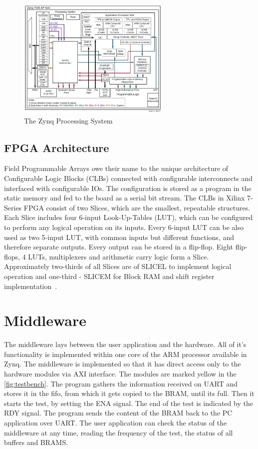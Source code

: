 \begin{figure}[H]
\centering
\includegraphics[width=0.65\textwidth]{figures/Zynq.png}
\caption{The Zynq Processing System~\cite{book:ZynqBook}}
\label{fig:Zynq}
\end{figure}

\subsection{FPGA Architecture}
Field Programmable Arrays owe their name to the unique architecture of Configurable Logic Blocks (CLBs) connected with configurable interconnects and interfaced with configurable IOs. The configuration is stored as a program in the static memory and fed to the board as a serial bit stream. The CLBs in Xilinx 7-Series FPGA consist of two Slices, which are the smallest, repeatable structures. Each Slice includes four 6-input Look-Up-Tables (LUT), which can be configured to perform any logical operation on its inputs. Every 6-input LUT can be also used as two 5-input LUT, with common inputs but different functions, and therefore separate outputs. Every output can be stored in a flip-flop. Eight flip-flops, 4 LUTs, multiplexers and arithmetic carry logic form a Slice. Approximately two-thirds of all Slices are of SLICEL to implement logical operation and one-third - SLICEM for Block RAM and shift register implementation~\cite{report:CLB}.

\section{Middleware}
The middleware lays between the user application and the hardware. All of it's functionality is implemented within one core of the ARM processor available in Zynq. The middleware is implemented so that it has direct access only to the hardware modules via AXI interface. The modules are marked yellow in the \autoref{fig:testbench}. The program gathers the information received on UART and stores it in the fifo, from which it gets copied to the BRAM, until its full. Then it starts the test, by setting the ENA signal. The end of the test is indicated by the RDY signal. The program sends the content of the BRAM back to the PC application over UART. The user application can check the status of the middleware at any time, reading the frequency of the test, the status of all buffers and BRAMS.

